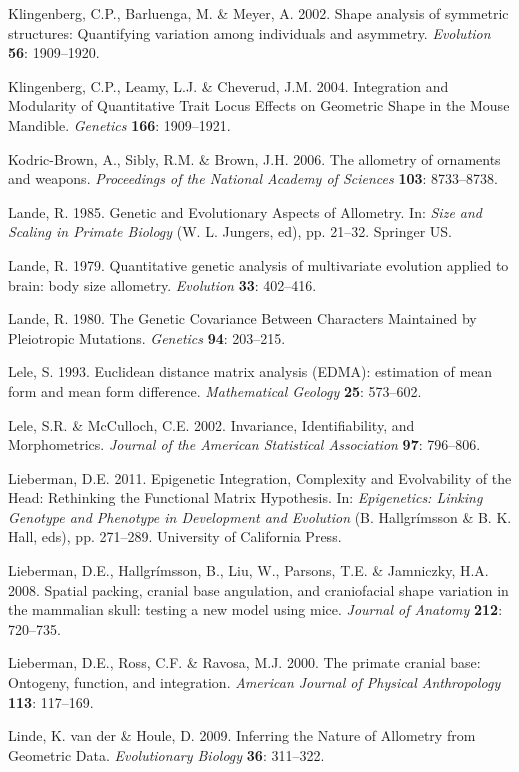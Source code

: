 \documentclass[12pt,twoside]{report}
\begin{document}
Klingenberg, C.P., Barluenga, M. \& Meyer, A. 2002. Shape analysis of
symmetric structures: Quantifying variation among individuals and
asymmetry. \emph{Evolution} \textbf{56}: 1909--1920.

Klingenberg, C.P., Leamy, L.J. \& Cheverud, J.M. 2004. Integration and
Modularity of Quantitative Trait Locus Effects on Geometric Shape in the
Mouse Mandible. \emph{Genetics} \textbf{166}: 1909--1921.

Kodric-Brown, A., Sibly, R.M. \& Brown, J.H. 2006. The allometry of
ornaments and weapons. \emph{Proceedings of the National Academy of
Sciences} \textbf{103}: 8733--8738.

Lande, R. 1985. Genetic and Evolutionary Aspects of Allometry. In:
\emph{Size and Scaling in Primate Biology} (W. L. Jungers, ed), pp.
21--32. Springer US.

Lande, R. 1979. Quantitative genetic analysis of multivariate evolution
applied to brain: body size allometry. \emph{Evolution} \textbf{33}:
402--416.

Lande, R. 1980. The Genetic Covariance Between Characters Maintained by
Pleiotropic Mutations. \emph{Genetics} \textbf{94}: 203--215.

Lele, S. 1993. Euclidean distance matrix analysis (EDMA): estimation of
mean form and mean form difference. \emph{Mathematical Geology}
\textbf{25}: 573--602.

Lele, S.R. \& McCulloch, C.E. 2002. Invariance, Identifiability, and
Morphometrics. \emph{Journal of the American Statistical Association}
\textbf{97}: 796--806.

Lieberman, D.E. 2011. Epigenetic Integration, Complexity and
Evolvability of the Head: Rethinking the Functional Matrix Hypothesis.
In: \emph{Epigenetics: Linking Genotype and Phenotype in Development and
Evolution} (B. Hallgrímsson \& B. K. Hall, eds), pp. 271--289.
University of California Press.

Lieberman, D.E., Hallgrímsson, B., Liu, W., Parsons, T.E. \& Jamniczky,
H.A. 2008. Spatial packing, cranial base angulation, and craniofacial
shape variation in the mammalian skull: testing a new model using mice.
\emph{Journal of Anatomy} \textbf{212}: 720--735.

Lieberman, D.E., Ross, C.F. \& Ravosa, M.J. 2000. The primate cranial
base: Ontogeny, function, and integration. \emph{American Journal of
Physical Anthropology} \textbf{113}: 117--169.

Linde, K. van der \& Houle, D. 2009. Inferring the Nature of Allometry
from Geometric Data. \emph{Evolutionary Biology} \textbf{36}: 311--322.
\end{document}
